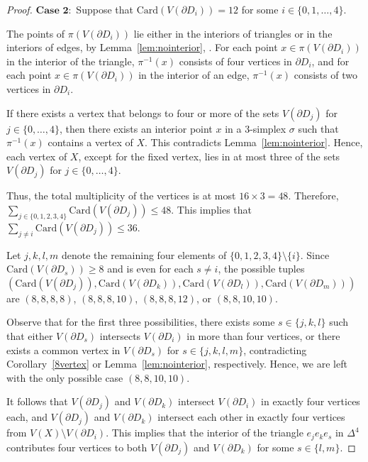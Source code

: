 \documentclass[11pt]{amsart}
\numberwithin{equation}{section}
\theoremstyle{definition}
\newcommand{\D}{\Delta}
\begin{document}
\begin{proof}
$\textbf{Case 2}:$ Suppose that $\mathrm{Card}(V(\partial D_i))= 12$ for some $i\in \{0,1,\ldots,4\}$. 

The points of $\pi(V(\partial D_i))$ lie either in the interiors of triangles or in the interiors of edges, by Lemma~\ref{lem:nointerior}, . For each point $x\in \pi(V(\partial D_i))$ in the interior of the triangle, $\pi^{-1}(x)$ consists of four vertices in $\partial D_i$, and for each point $x\in \pi(V(\partial D_i))$ in the interior of an edge, $\pi^{-1}(x)$ consists of two vertices in $\partial D_i$.

If there exists a vertex that belongs to four or more of the sets $V(\partial D_j)$ for $j\in\{0,\ldots,4\}$, then there exists an interior point $x$ in a $3$-simplex $\sigma$ such that $\pi^{-1}(x)$ contains a vertex of $X$. This contradicts Lemma~\ref{lem:nointerior}. Hence, each vertex of $X$, except for the fixed vertex, lies in at most three of the sets $V(\partial D_j)$ for $j\in\{0,\ldots,4\}$.

Thus, the total multiplicity of the vertices is at most $16 \times 3 = 48$. Therefore, $\sum_{j \in \{0,1,2,3,4\}} \mathrm{Card}(V(\partial D_j)) \le 48$. This implies that $\sum_{j \ne i} \mathrm{Card}(V(\partial D_j)) \le 36$. 

Let $j, k, l, m$ denote the remaining four elements of $\{0,1,2,3,4\} \setminus \{i\}$. Since $\mathrm{Card}(V(\partial D_s)) \ge 8$ and is even for each $s \ne i$, the possible tuples $(\mathrm{Card}(V(\partial D_j)), \mathrm{Card}(V(\partial D_k)), \mathrm{Card}(V(\partial D_l)), \mathrm{Card}(V(\partial D_m)))$ are $(8,8,8,8)$, $(8,8,8,10)$, $(8,8,8,12)$, or $(8,8,10,10)$.

Observe that for the first three possibilities, there exists some $s \in \{j, k, l\}$ such that either $V(\partial D_s)$ intersects $V(\partial D_i)$ in more than four vertices, or there exists a common vertex in $V(\partial D_s)$ for $s \in \{j, k, l, m\}$, contradicting Corollary~\ref{8vertex} or Lemma~\ref{lem:nointerior}, respectively. Hence, we are left with the only possible case $(8,8,10,10)$.

It follows that $V(\partial D_j)$ and $V(\partial D_k)$ intersect $V(\partial D_i)$ in exactly four vertices each, and $V(\partial D_j)$ and $V(\partial D_k)$ intersect each other in exactly four vertices from $V(X) \setminus V(\partial D_i)$. This implies that the interior of the triangle $e_j e_k e_s$ in $\D^4$ contributes four vertices to both $V(\partial D_j)$ and $V(\partial D_k)$ for some $s \in \{l, m\}$. 


\end{proof}
\end{document}

